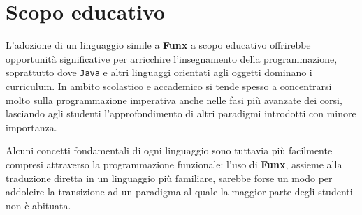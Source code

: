 \section{Scopo educativo}
\label{sec:6-3-educational-purpose}

L'adozione di un linguaggio simile a \textbf{Funx} a scopo educativo offrirebbe opportunità significative
per arricchire l'insegnamento della programmazione, soprattutto dove \texttt{Java} e altri linguaggi
orientati agli oggetti dominano i curriculum. In ambito scolastico e accademico si tende spesso a concentrarsi
molto sulla programmazione imperativa anche nelle fasi più avanzate dei corsi,
lasciando agli studenti l'approfondimento di altri paradigmi introdotti con minore importanza.

Alcuni concetti fondamentali di ogni linguaggio sono tuttavia più facilmente compresi attraverso la programmazione funzionale:
l'uso di \textbf{Funx}, assieme alla traduzione diretta in un linguaggio più familiare, sarebbe forse un modo per addolcire
la transizione ad un paradigma al quale la maggior parte degli studenti non è abituata.